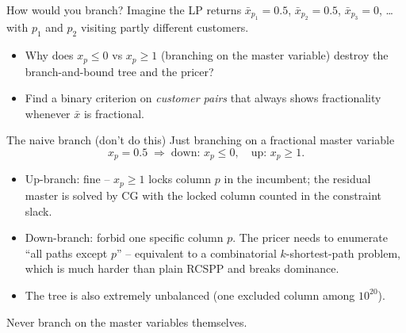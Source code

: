 \documentclass[10pt,aspectratio=169]{beamer}
\begin{document}
\begin{frame}{How would you branch?}
  Imagine the LP returns
  $\bar x_{p_1}=0.5$, $\bar x_{p_2}=0.5$, $\bar x_{p_3}=0$, …
  with $p_1$ and $p_2$ visiting partly different customers.

  \medskip
  \begin{keybox}[Questions]
    \begin{itemize}
      \item Why does \alert{$x_p\!\le\!0$ vs $x_p\!\ge\!1$} (branching on the
            master variable) destroy the branch-and-bound tree and the pricer?
      \item Find a binary criterion on \emph{customer pairs} that always
            shows fractionality whenever $\bar x$ is fractional.
    \end{itemize}
  \end{keybox}
  \medskip
\end{frame}

\begin{frame}{The naive branch (don't do this)}
  Just branching on a fractional master variable
  \[
     x_p = 0.5 \;\Longrightarrow\; \text{down: } x_p\le 0,\quad
                                   \text{up: } x_p\ge 1.
  \]
  \begin{itemize}\small
    \item Up-branch: fine -- $x_p\!\ge\!1$ locks column $p$ in the
          incumbent; the residual master is solved by CG with the locked
          column counted in the constraint slack.
    \item Down-branch: \alert{forbid one specific column} $p$. The pricer
          needs to enumerate ``all paths except $p$'' -- equivalent to a
          combinatorial $k$-shortest-path problem, which is much harder than
          plain RCSPP and \alert{breaks dominance}.
    \item The tree is also extremely unbalanced (one excluded column among
          $10^{20}$).
  \end{itemize}
  \begin{warnbox}
    Never branch on the master variables themselves.
  \end{warnbox}
\end{frame}
\end{document}
